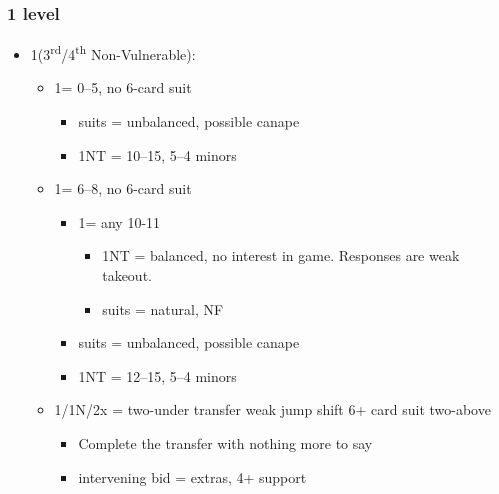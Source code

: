 \documentclass[a4paper,14pt]{extarticle}
\begin{document}
\subsubsection{1 level}
\label{sec:resp:1level}

\begin{itemize}
\label{note:14}
\item 1\clubs (3\textsuperscript{rd}/4\textsuperscript{th} Non-Vulnerable):
	\begin{itemize}
   \item 1\diamonds = 0--5, no 6-card suit
		\begin{itemize}
      \item suits = unbalanced, possible canape
      \item 1NT = 10--15, 5--4 minors
		\end{itemize}
   \item 1\hearts = 6--8, no 6-card suit
		\begin{itemize}
      \item 1\spades = any 10-11
			\begin{itemize}
			\item 1NT = balanced, no interest in game. Responses are weak takeout.
			\item suits = natural, NF
			\end{itemize}
      \item suits = unbalanced, possible canape
      \item 1NT = 12--15, 5--4 minors
		\end{itemize}
   \item 1\spades/1N/2x = two-under transfer weak jump shift 6+ card suit two-above
		\begin{itemize}
		\item Complete the transfer with nothing more to say
		\item intervening bid = extras, 4+ support
		\end{itemize}
	\end{itemize}

\newpage


\end{itemize}
\end{document}

